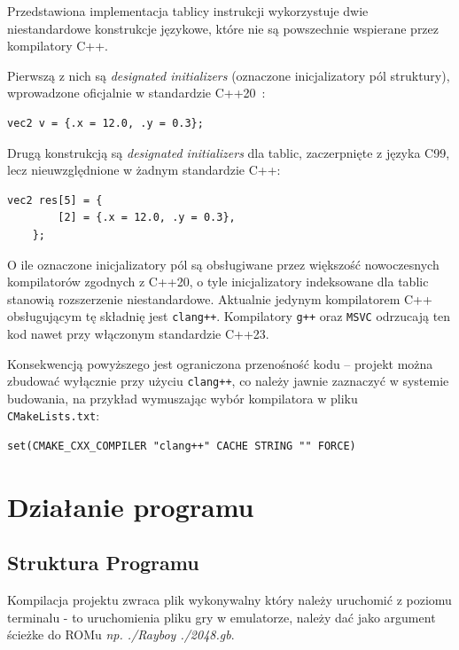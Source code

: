 \documentclass{article}
\begin{document}
Przedstawiona implementacja tablicy instrukcji wykorzystuje dwie niestandardowe konstrukcje językowe,
które nie są powszechnie wspierane przez kompilatory C++.

Pierwszą z nich są \textit{designated initializers} (oznaczone inicjalizatory pól struktury),
wprowadzone oficjalnie w standardzie C++20~\cite{cpp20standard}:

\begin{lstlisting}[style=cpp, caption={Oznaczone inicjalizatory pól struktury}]
	vec2 v = {.x = 12.0, .y = 0.3};
\end{lstlisting}

Drugą konstrukcją są \textit{designated initializers} dla tablic, zaczerpnięte z języka C99,
lecz nieuwzględnione w żadnym standardzie C++:

\begin{lstlisting}[style=cpp, caption={Nieoznaczone inicjalizatory tablic -- rozszerzenie niestandardowe}]
	vec2 res[5] = {
		[2] = {.x = 12.0, .y = 0.3},
	};
\end{lstlisting}

O ile oznaczone inicjalizatory pól są obsługiwane przez większość nowoczesnych kompilatorów
zgodnych z C++20, o tyle inicjalizatory indeksowane dla tablic stanowią rozszerzenie
niestandardowe. Aktualnie jedynym kompilatorem C++ obsługującym tę składnię jest
\texttt{clang++}. Kompilatory \texttt{g++} oraz \texttt{MSVC} odrzucają ten kod nawet
przy włączonym standardzie C++23.

Konsekwencją powyższego jest ograniczona przenośność kodu -- projekt można zbudować
wyłącznie przy użyciu \texttt{clang++}, co należy jawnie zaznaczyć w systemie budowania,
na przykład wymuszając wybór kompilatora w pliku \texttt{CMakeLists.txt}:

\begin{lstlisting}[style=cpp, caption={Wymuszenie kompilatora \texttt{clang++} w CMake}]
	set(CMAKE_CXX_COMPILER "clang++" CACHE STRING "" FORCE)
\end{lstlisting}
\newpage
\section{Działanie programu}
\subsection{Struktura Programu}

Kompilacja projektu zwraca plik wykonywalny który należy uruchomić z poziomu terminalu - to uruchomienia pliku gry w emulatorze, należy dać jako argument ścieżke do ROMu \textit{np. ./Rayboy ./2048.gb}.
\end{document}
